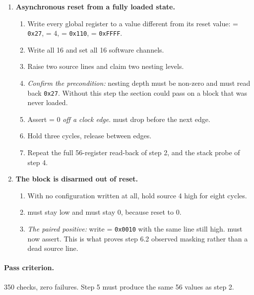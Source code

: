 \begin{enumerate}[leftmargin=*,itemsep=4pt]
\item[\textbf{5}] \textbf{Asynchronous reset from a fully loaded state.}
\begin{enumerate}[label=5.\arabic*,leftmargin=12mm,itemsep=1pt]
  \item Write every global register to a value different from its reset value:
         = \texttt{0x27},  = 4,
         = \texttt{0x110},  =
        \texttt{0xFFFF}.
  \item Write all 16  and set all 16 software channels.
  \item Raise two source lines and claim two nesting levels.
  \item \emph{Confirm the precondition:} nesting depth must be non-zero and
         must read back \texttt{0x27}. Without this step the
        section could pass on a block that was never loaded.
  \item Assert  = 0 \emph{off a clock edge}.  must
        drop before the next edge.
  \item Hold three cycles, release between edges.
  \item Repeat the full 56-register read-back of step 2, and the stack probe of
        step 4.
\end{enumerate}

\item[\textbf{6}] \textbf{The block is disarmed out of reset.}
\begin{enumerate}[label=6.\arabic*,leftmargin=12mm,itemsep=1pt]
  \item With no configuration written at all, hold source 4 high for eight
        cycles.
  \item {} must stay low and  must stay 0,
        because  reset to 0.
  \item \emph{The paired positive:} write  = \texttt{0x0010}
        with the same line still high.  must now assert. This is
        what proves step 6.2 observed masking rather than a dead source line.
\end{enumerate}
\end{enumerate}

\paragraph{Pass criterion.} 350 checks, zero failures. Step 5 must produce the
same 56 values as step 2.

